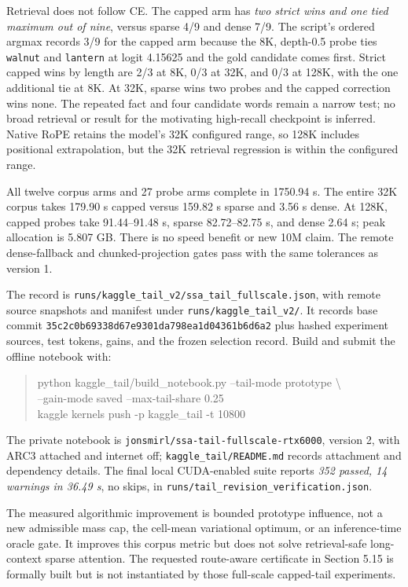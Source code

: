 \documentclass[11pt]{article}
\numberwithin{equation}{section}
\begin{document}
Retrieval does not follow CE. The capped arm has \emph{two strict wins and one tied maximum out of nine},
versus sparse 4/9 and dense 7/9. The script's ordered argmax records 3/9 for the capped arm because the
8K, depth-0.5 probe ties \texttt{walnut} and \texttt{lantern} at logit 4.15625 and the gold candidate comes
first. Strict capped wins by length are 2/3 at 8K, 0/3 at 32K, and 0/3 at 128K, with the one additional
tie at 8K. At 32K, sparse wins two probes and the capped correction wins none. The repeated fact and
four candidate words remain a narrow test; no broad retrieval or result for the motivating high-recall checkpoint
is inferred. Native RoPE retains the model's 32K configured range, so 128K includes positional
extrapolation, but the 32K retrieval regression is within the configured range.

All twelve corpus arms and 27 probe arms complete in 1750.94 s. The entire 32K corpus takes 179.90 s
capped versus 159.82 s sparse and 3.56 s dense. At 128K, capped probes take 91.44--91.48 s, sparse
82.72--82.75 s, and dense 2.64 s; peak allocation is 5.807 GB. There is no speed benefit or new 10M
claim. The remote dense-fallback and chunked-projection gates pass with the same tolerances as version 1.

The record is \nolinkurl{runs/kaggle_tail_v2/ssa_tail_fullscale.json}, with remote source snapshots and
manifest under \nolinkurl{runs/kaggle_tail_v2/}. It records base commit
\texttt{35c2c0b69338d67e9301\allowbreak da798ea1d04361b6d6a2} plus hashed experiment sources, test tokens, gains,
and the frozen selection record. Build and submit the offline notebook with:
\begin{quote}\small\ttfamily\raggedright
python kaggle\_tail/build\_notebook.py --tail-mode prototype \textbackslash{}\\
--gain-mode saved --max-tail-share 0.25\\
kaggle kernels push -p kaggle\_tail -t 10800
\end{quote}
The private notebook is \nolinkurl{jonsmirl/ssa-tail-fullscale-rtx6000}, version 2, with ARC3 attached and
internet off; \nolinkurl{kaggle_tail/README.md} records attachment and dependency details. The final local
CUDA-enabled suite reports \emph{352 passed, 14 warnings in 36.49 s}, no skips, in
\nolinkurl{runs/tail_revision_verification.json}.

The measured algorithmic improvement is bounded prototype influence, not a new admissible mass cap,
the cell-mean variational optimum, or an inference-time oracle gate. It improves this corpus metric but
does not solve retrieval-safe long-context sparse attention. The requested route-aware certificate in
Section 5.15 is formally built but is not instantiated by those full-scale capped-tail experiments.
\end{document}
